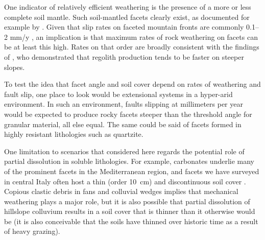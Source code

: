 
One indicator of relatively efficient weathering is the presence of a more or less complete soil mantle. Such soil-mantled facets clearly exist, as documented for example by \citet{menges1990soils}. Given that slip rates on faceted mountain fronts are commonly 0.1--2 mm/y \citep{depolo2000estimating}, an implication is that maximum rates of rock weathering on facets can be at least this high. Rates on that order are broadly consistent with the findings of \citet{heimsath2012soil}, who demonstrated  that regolith production tends to be faster on steeper slopes.


To test the idea that facet angle and soil cover depend on rates of weathering and fault slip, one place to look would be extensional systems in a hyper-arid environment. In such an environment, faults slipping at millimeters per year would be expected to produce rocky facets steeper than the threshold angle for granular material, all else equal. The same could be said of facets formed in highly resistant lithologies such as quartzite.

One limitation to scenarios that considered here regards the potential role of partial dissolution in soluble lithologies. For example, carbonates underlie many of the prominent facets in the Mediterranean region, and facets we have surveyed in central Italy often host a thin (order 10~cm) and discontinuous soil cover \citep{tucker2011geomorphic}. Copious clastic debris in fans and colluvial wedges implies that mechanical weathering plays a major role, but it is also possible that partial dissolution of hillslope colluvium results in a soil cover that is thinner than it otherwise would be (it is also conceivable that the soils have thinned over historic time as a result of heavy grazing).


